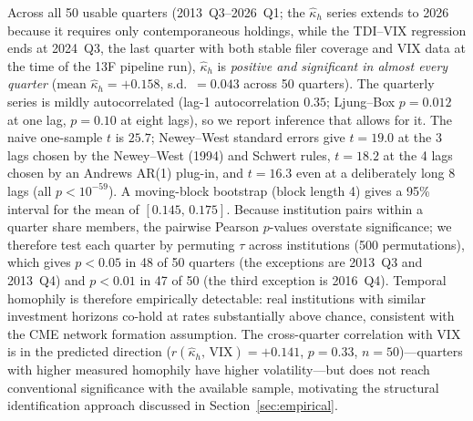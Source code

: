 \documentclass[preprint,12pt,authoryear]{elsarticle}
\begin{document}
Across all 50 usable quarters (2013~Q3--2026~Q1; the $\hat{\kappa}_h$
series extends to 2026 because it requires only contemporaneous
holdings, while the TDI--VIX regression ends at 2024~Q3, the last
quarter with both stable filer coverage and VIX data at the time of
the 13F pipeline run), $\hat{\kappa}_h$ is
\emph{positive and significant in almost every quarter}
(mean $\hat{\kappa}_h = +0.158$, s.d.\ $= 0.043$ across 50 quarters).
The quarterly series is mildly autocorrelated (lag-1 autocorrelation
$0.35$; Ljung--Box $p = 0.012$ at one lag, $p = 0.10$ at eight lags), so we
report inference that allows for it.
The naive one-sample $t$ is $25.7$; Newey--West standard errors give
$t = 19.0$ at the 3 lags chosen by the Newey--West (1994) and Schwert rules,
$t = 18.2$ at the 4 lags chosen by an Andrews AR(1) plug-in, and $t = 16.3$
even at a deliberately long 8 lags (all $p < 10^{-59}$).
A moving-block bootstrap (block length 4) gives a 95\% interval for the mean
of $[0.145,\,0.175]$.
Because institution pairs within a quarter share members, the pairwise
Pearson $p$-values overstate significance; we therefore test each quarter by
permuting $\tau$ across institutions (500 permutations), which gives
$p < 0.05$ in 48 of 50 quarters (the exceptions are 2013~Q3 and 2013~Q4)
and $p < 0.01$ in 47 of 50 (the third exception is 2016~Q4).
Temporal homophily is therefore empirically detectable: real institutions
with similar investment horizons co-hold at rates substantially above
chance, consistent with the CME network formation assumption.
The cross-quarter correlation with VIX is in the predicted direction
($r(\hat{\kappa}_h,\,\mathrm{VIX}) = +0.141$, $p = 0.33$, $n = 50$)---quarters
with higher measured homophily have higher volatility---but does not reach
conventional significance with the available sample, motivating the
structural identification approach discussed in Section~\ref{sec:empirical}.
\end{document}

